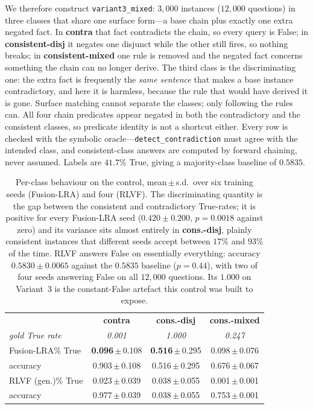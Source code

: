 \documentclass{article}
\begin{document}
We therefore construct \texttt{variant3\_mixed}: $3{,}000$ instances
($12{,}000$ questions) in three classes that share one surface form---a base
chain plus exactly one extra negated fact. In \textbf{contra} that fact
contradicts the chain, so every query is False; in \textbf{consistent-disj} it
negates one disjunct while the other still fires, so nothing breaks; in
\textbf{consistent-mixed} one rule is removed and the negated fact concerns
something the chain can no longer derive. The third class is the discriminating
one: the extra fact is frequently the
\emph{same sentence} that makes a base instance contradictory, and here it is
harmless, because the rule that would have derived it is gone. Surface matching
cannot separate the classes; only following the rules can. All four chain
predicates appear negated in both the contradictory and the consistent classes,
so predicate identity is not a shortcut either. Every row is checked with the
symbolic oracle---\texttt{detect\_contradiction} must agree with the intended
class, and consistent-class answers are computed by forward chaining, never
assumed. Labels are $41.7\%$ True, giving a majority-class baseline of $0.5835$.

\begin{table}[h]
\centering\small
\caption{Per-class behaviour on the control, mean\,$\pm$\,s.d.\ over six
training seeds (Fusion-LRA) and four (\textsc{RLVF}). The discriminating
quantity is the gap between the consistent and contradictory True-rates; it is
positive for every Fusion-LRA seed ($0.420 \pm 0.200$, $p{=}0.0018$ against
zero) and its variance sits almost entirely in \textbf{cons.-disj}, plainly
consistent instances that different seeds accept between $17\%$ and $93\%$ of
the time. \textsc{RLVF} answers False on essentially everything: accuracy
$0.5830 \pm 0.0065$ against the $0.5835$ baseline ($p{=}0.44$), with two of
four seeds answering False on all $12{,}000$ questions. Its $1.000$ on
Variant~3 is the constant-False artefact this control was built to expose.}
\label{tab:v3control}
\begin{tabular}{lccc}
\toprule
& \textbf{contra} & \textbf{cons.-disj} & \textbf{cons.-mixed} \\
\emph{gold True rate} & \emph{0.001} & \emph{1.000} & \emph{0.247} \\
\midrule
Fusion-LRA\quad \% True & \textbf{0.096}\,$\pm$\,0.108 & \textbf{0.516}\,$\pm$\,0.295 & 0.098\,$\pm$\,0.076 \\
\quad accuracy & 0.903\,$\pm$\,0.108 & 0.516\,$\pm$\,0.295 & 0.676\,$\pm$\,0.067 \\
\midrule
\textsc{RLVF} (gen.)\quad \% True & 0.023\,$\pm$\,0.039 & 0.038\,$\pm$\,0.055 & 0.001\,$\pm$\,0.001 \\
\quad accuracy & 0.977\,$\pm$\,0.039 & 0.038\,$\pm$\,0.055 & 0.753\,$\pm$\,0.001 \\
\bottomrule
\end{tabular}
\end{table}
\end{document}
